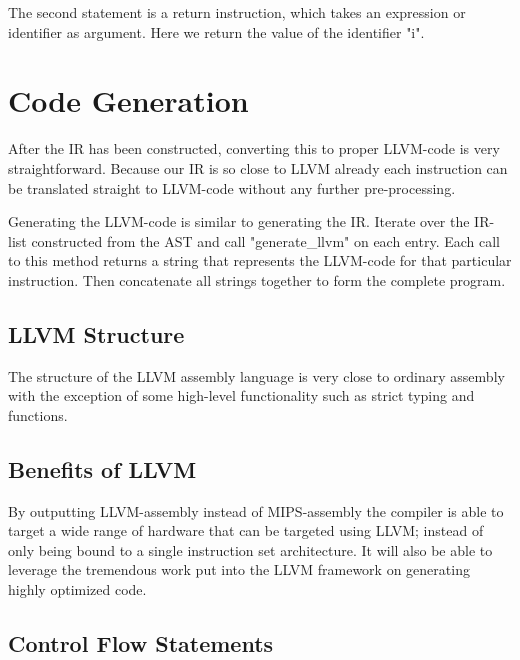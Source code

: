 The second statement is a return instruction, which takes an expression or identifier as argument. Here we return the value of the identifier "i".

\section{Code Generation}

After the IR has been constructed, converting this to proper LLVM-code is very straightforward. Because our IR is so close to LLVM already each instruction can be translated straight to LLVM-code without any further pre-processing.

Generating the LLVM-code is similar to generating the IR. Iterate over the IR-list constructed from the AST and call "generate\_llvm" on each entry. Each call to this method returns a string that represents the LLVM-code for that particular instruction. Then concatenate all strings together to form the complete program.

\subsection{LLVM Structure}

The structure of the LLVM assembly language is very close to ordinary assembly with the exception of some high-level functionality such as strict typing and functions.


\subsection{Benefits of LLVM}
By outputting LLVM-assembly instead of MIPS-assembly the compiler is able to target a wide range of hardware that can be targeted using LLVM; instead of only being bound to a single instruction set architecture.
It will also be able to leverage the tremendous work put into the LLVM framework on generating highly optimized code.

\subsection{Control Flow Statements}



